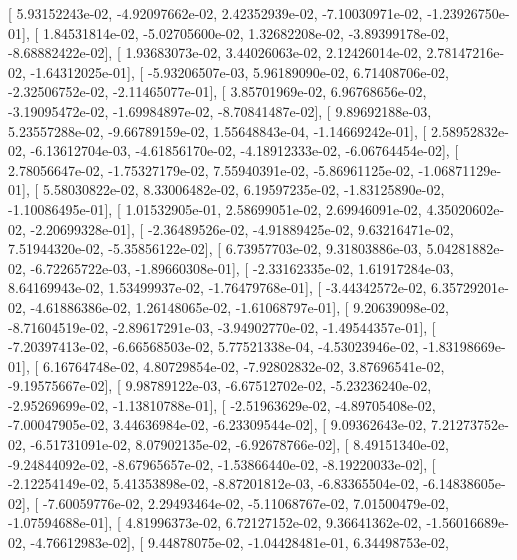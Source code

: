 \documentclass{article}
\begin{document}
       [  5.93152243e-02,  -4.92097662e-02,   2.42352939e-02,
         -7.10030971e-02,  -1.23926750e-01],
       [  1.84531814e-02,  -5.02705600e-02,   1.32682208e-02,
         -3.89399178e-02,  -8.68882422e-02],
       [  1.93683073e-02,   3.44026063e-02,   2.12426014e-02,
          2.78147216e-02,  -1.64312025e-01],
       [ -5.93206507e-03,   5.96189090e-02,   6.71408706e-02,
         -2.32506752e-02,  -2.11465077e-01],
       [  3.85701969e-02,   6.96768656e-02,  -3.19095472e-02,
         -1.69984897e-02,  -8.70841487e-02],
       [  9.89692188e-03,   5.23557288e-02,  -9.66789159e-02,
          1.55648843e-04,  -1.14669242e-01],
       [  2.58952832e-02,  -6.13612704e-03,  -4.61856170e-02,
         -4.18912333e-02,  -6.06764454e-02],
       [  2.78056647e-02,  -1.75327179e-02,   7.55940391e-02,
         -5.86961125e-02,  -1.06871129e-01],
       [  5.58030822e-02,   8.33006482e-02,   6.19597235e-02,
         -1.83125890e-02,  -1.10086495e-01],
       [  1.01532905e-01,   2.58699051e-02,   2.69946091e-02,
          4.35020602e-02,  -2.20699328e-01],
       [ -2.36489526e-02,  -4.91889425e-02,   9.63216471e-02,
          7.51944320e-02,  -5.35856122e-02],
       [  6.73957703e-02,   9.31803886e-03,   5.04281882e-02,
         -6.72265722e-03,  -1.89660308e-01],
       [ -2.33162335e-02,   1.61917284e-03,   8.64169943e-02,
          1.53499937e-02,  -1.76479768e-01],
       [ -3.44342572e-02,   6.35729201e-02,  -4.61886386e-02,
          1.26148065e-02,  -1.61068797e-01],
       [  9.20639098e-02,  -8.71604519e-02,  -2.89617291e-03,
         -3.94902770e-02,  -1.49544357e-01],
       [ -7.20397413e-02,  -6.66568503e-02,   5.77521338e-04,
         -4.53023946e-02,  -1.83198669e-01],
       [  6.16764748e-02,   4.80729854e-02,  -7.92802832e-02,
          3.87696541e-02,  -9.19575667e-02],
       [  9.98789122e-03,  -6.67512702e-02,  -5.23236240e-02,
         -2.95269699e-02,  -1.13810788e-01],
       [ -2.51963629e-02,  -4.89705408e-02,  -7.00047905e-02,
          3.44636984e-02,  -6.23309544e-02],
       [  9.09362643e-02,   7.21273752e-02,  -6.51731091e-02,
          8.07902135e-02,  -6.92678766e-02],
       [  8.49151340e-02,  -9.24844092e-02,  -8.67965657e-02,
         -1.53866440e-02,  -8.19220033e-02],
       [ -2.12254149e-02,   5.41353898e-02,  -8.87201812e-03,
         -6.83365504e-02,  -6.14838605e-02],
       [ -7.60059776e-02,   2.29493464e-02,  -5.11068767e-02,
          7.01500479e-02,  -1.07594688e-01],
       [  4.81996373e-02,   6.72127152e-02,   9.36641362e-02,
         -1.56016689e-02,  -4.76612983e-02],
       [  9.44878075e-02,  -1.04428481e-01,   6.34498753e-02,
\end{document}
